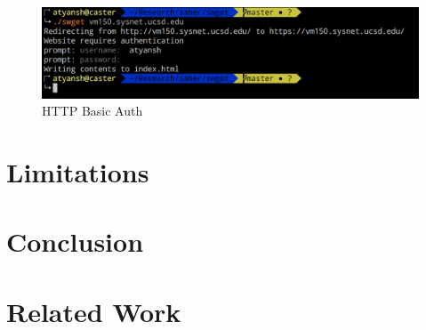 \begin{figure}[h]
  \includegraphics[width=\textwidth]{figures/basic-auth}
  \caption{HTTP Basic Auth} 
  \label{fig:basic-auth-saber}
\end{figure}


\section{Limitations}

\section{Conclusion}
\label{sec:conclusion-saber}

\section{Related Work}
\label{sec:related-saber}
